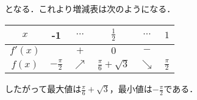 となる．これより増減表は次のようになる．

\begin{center}
  \begin{tabular}{|c||ccccc|}
    \hline
    $x$ & -1 & $\cdots$ & $\frac{1}{2}$ & $\cdots$ & $1$ \\
    \hline
    $f'(x)$ &  & $+$ & $0$ & $-$ & \\
    \hline
    $f(x)$ & $-\frac{\pi}{2}$ & $\nearrow$ & $\frac{\pi}{6} + \sqrt{3}$ & $\searrow$ & $\frac{\pi}{2}$ \\
    \hline
  \end{tabular}
\end{center}

したがって最大値は$\frac{\pi}{6} + \sqrt{3}$，最小値は$-\frac{\pi}{2}$である．


\section{}